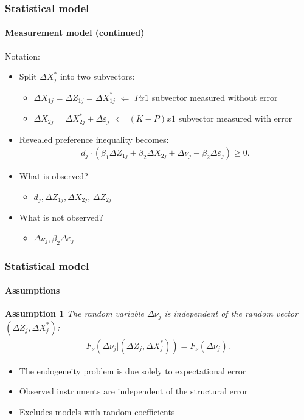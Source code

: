 \begin{frame}
\frametitle{Statistical model} \framesubtitle{Measurement model (continued)}

Notation:

\begin{itemize}
\item Split $\Delta X^{*}_{j}$ into two subvectors: 

\begin{itemize}
\item $\Delta X_{1j} = \Delta Z_{1j} = \Delta X^{*}_{1j}$ $\Longleftarrow$ $%
Px1$ subvector measured without error 

\item $\Delta X_{2j} = \Delta X^{*}_{2j}+\Delta\varepsilon_{j}$ $%
\Longleftarrow$ $(K-P)x1$ subvector measured with error 
\end{itemize}

\item Revealed preference inequality becomes:  
\begin{align*}
d_{j} \cdot (\beta_{1}\Delta Z_{1j}+\beta_{2}\Delta
X_{2j}+\Delta\nu_{j}-\beta_{2}\Delta\varepsilon_{j})\geq 0.
\end{align*}

\item What is observed? 

\begin{itemize}
\item $d_{j}, \Delta Z_{1j},\Delta X_{2j}$, $\Delta Z_{2j}$ 
\end{itemize}

\item What is not observed? 

\begin{itemize}
\item $\Delta\nu_{j},\beta_{2}\Delta\varepsilon_{j}$ 
\end{itemize}
\end{itemize}
\end{frame}


\begin{frame}
\frametitle{Statistical model} \framesubtitle{Assumptions}

\textbf{Assumption 1} \textit{The random variable $\Delta\nu_{j}$ is
independent of the random vector $(\Delta Z_{j},\Delta X^{*}_{j})$: 
\begin{align*}
F_{\nu}(\Delta\nu_{j}|(\Delta Z_{j},\Delta
X^{*}_{j}))=F_{\nu}(\Delta\nu_{j}).
\end{align*}%
} \pause

\begin{itemize}
\item The endogeneity problem is due solely to expectational error

\item Observed instruments are independent of the structural error

\item Excludes models with random coefficients
\end{itemize}
\end{frame}

